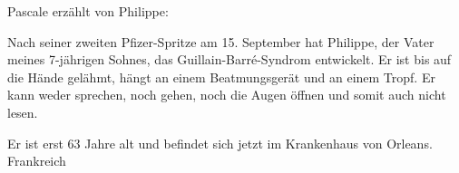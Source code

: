 Pascale erzählt von Philippe:

Nach seiner zweiten Pfizer-Spritze am 15. September hat Philippe, der Vater
meines 7-jährigen Sohnes, das Guillain-Barré-Syndrom entwickelt. Er ist bis auf
die Hände gelähmt, hängt an einem Beatmungsgerät und an einem Tropf. Er kann
weder sprechen, noch gehen, noch die Augen öffnen und somit auch nicht lesen.

Er ist erst 63 Jahre alt und befindet sich jetzt im Krankenhaus von
Orleans. Frankreich

